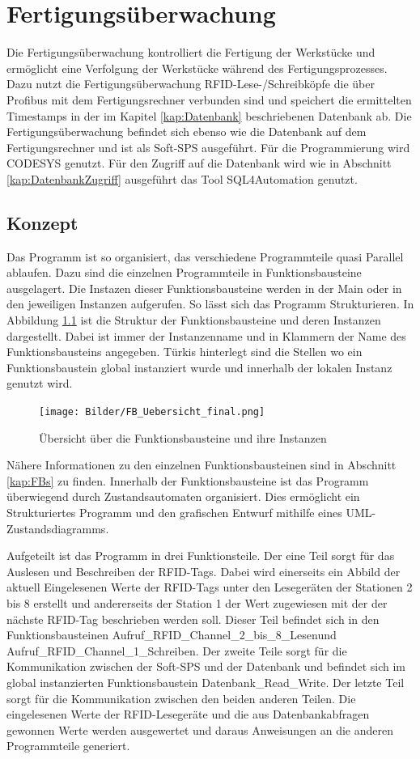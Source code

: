 
\chapter{Fertigungsüberwachung}\label{Fertigungsueberwachung}
Die Fertigungsüberwachung kontrolliert die Fertigung der Werkstücke und ermöglicht eine Verfolgung der Werkstücke während des Fertigungsprozesses. Dazu nutzt die Fertigungsüberwachung RFID-Lese-/Schreibköpfe die über Profibus mit dem Fertigungsrechner verbunden sind und speichert die ermittelten Timestamps in der im Kapitel \ref{kap:Datenbank} beschriebenen Datenbank ab.
Die Fertigungsüberwachung befindet sich ebenso wie die Datenbank auf dem Fertigungsrechner und ist als Soft-SPS ausgeführt. Für die Programmierung wird CODESYS genutzt. Für den Zugriff auf die Datenbank wird wie in Abschnitt \ref{kap:DatenbankZugriff} ausgeführt das Tool SQL4Automation genutzt.

\section{Konzept}
Das Programm ist so organisiert, das verschiedene Programmteile quasi Parallel ablaufen. Dazu sind die einzelnen Programmteile in Funktionsbausteine ausgelagert. Die Instazen dieser Funktionsbausteine werden in der Main oder in den jeweiligen Instanzen aufgerufen. So lässt sich das Programm Strukturieren. In Abbildung \ref{fig:FB_Uebersicht} ist die Struktur der Funktionsbausteine und deren Instanzen dargestellt. Dabei ist immer der Instanzenname und in Klammern der Name des Funktionsbausteins angegeben. Türkis hinterlegt sind die Stellen wo ein Funktionsbaustein global instanziert wurde und innerhalb der lokalen Instanz genutzt wird.
\begin{figure}[h]
	    \centering
	    \texttt{[image: Bilder/FB\_Uebersicht\_final.png]}
        \caption{Übersicht über die Funktionsbausteine und ihre Instanzen}
        \label{fig:FB_Uebersicht}
\end{figure}
Nähere Informationen zu den einzelnen Funktionsbausteinen sind in Abschnitt \ref{kap:FBs} zu finden. Innerhalb der Funktionsbausteine ist das Programm überwiegend durch Zustandsautomaten organisiert. Dies ermöglicht ein Strukturiertes Programm und den grafischen Entwurf mithilfe eines UML-Zustandsdiagramms.

Aufgeteilt ist das Programm in drei Funktionsteile. Der eine Teil sorgt für das Auslesen und Beschreiben der RFID-Tags. Dabei wird einerseits ein Abbild der aktuell Eingelesenen Werte der RFID-Tags unter den Lesegeräten der Stationen 2 bis 8 erstellt und andererseits der Station 1 der Wert zugewiesen mit der der nächste RFID-Tag beschrieben werden soll. Dieser Teil befindet sich in den Funktionsbausteinen \glqq Aufruf\_RFID\_Channel\_2\_bis\_8\_Lesen\grqq  und \glqq Aufruf\_RFID\_Channel\_1\_Schreiben\grqq . Der zweite Teile sorgt für die Kommunikation zwischen der Soft-SPS und der Datenbank und befindet sich im global instanzierten Funktionsbaustein \glqq Datenbank\_Read\_Write\grqq . Der letzte Teil sorgt für die Kommunikation zwischen den beiden anderen Teilen. Die eingelesenen Werte der RFID-Lesegeräte und die aus Datenbankabfragen gewonnen Werte werden ausgewertet und daraus Anweisungen an die anderen Programmteile generiert. 

